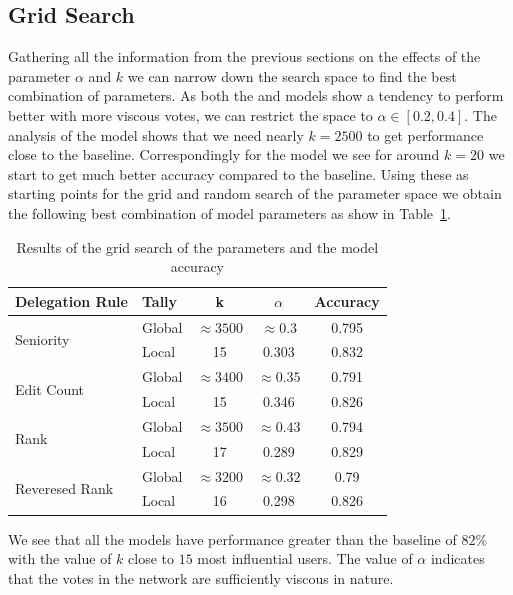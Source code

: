 \subsection{Grid Search}
Gathering all the information from the previous sections on the effects of the parameter $\alpha$ and $k$ we can narrow down the search space to find the best combination of parameters. As both the \localv and \globalv models show a tendency to perform better with more viscous votes, we can restrict the space to $\alpha \in [0.2,0.4]$. The analysis of the \globalv model shows that we need nearly $k=2500$ to get performance close to the baseline. Correspondingly for the \localv model we see for around $k=20$ we start to get much better accuracy compared to the baseline. Using these as starting points for the grid and random search of the parameter space we obtain the following best combination of model parameters as show in Table~\ref{tab:grid-search}.
\begin{table}
    \centering
    \caption{Results of the grid search of the parameters and the model accuracy}
    \label{tab:grid-search}
    \begin{tabular}{llccc}
        \toprule
        Delegation Rule & Tally & k & $\alpha$ & Accuracy \\ \midrule
        \multirow{2}{*}{Seniority} & Global & $\approx 3500$ & $\approx 0.3$ & 0.795   \\ 
        \cmidrule{2-5}
        & Local & 15 & 0.303& 0.832  \\
        \midrule
        \multirow{2}{*}{Edit Count} & Global & $\approx 3400$ & $\approx 0.35$ & 0.791 \\
        \cmidrule{2-5}
        & Local & 15 & 0.346 & 0.826 \\
        \midrule
        \multirow{2}{*}{Rank} & Global & $\approx 3500$ & $\approx 0.43$ & 0.794\\
        \cmidrule{2-5}
        & Local & 17 & 0.289 & 0.829  \\
        \midrule
        \multirow{2}{*}{Reveresed Rank} & Global & $\approx 3200$ & $\approx 0.32$ & 0.79  \\
        \cmidrule{2-5}
        & Local & 16 & 0.298 & 0.826  \\
        \bottomrule
        \end{tabular}
\end{table}

We see that all the \localv models have performance greater than the baseline of $82\%$ with the value of $k$ close to $15$ most influential users. The value of $\alpha$ indicates that the votes in the network are sufficiently viscous in nature. 